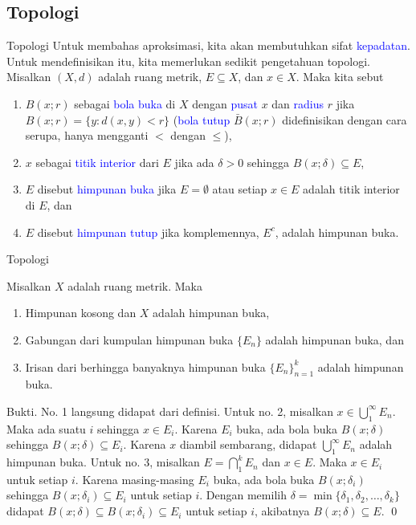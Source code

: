 \documentclass[xcolor={dvipsnames}, 9pt]{beamer}
\renewcommand{\emph}[1]{\textcolor{Blue}{#1}}
\begin{document}
    \subsection{Topologi}
    \begin{frame}{Topologi}
    	Untuk membahas aproksimasi, kita akan membutuhkan sifat \emph{kepadatan}. Untuk mendefinisikan itu, kita memerlukan sedikit pengetahuan topologi. \newline
    	Misalkan $(X,d)$ adalah ruang metrik, $E\subseteq X$, dan $x\in X$. Maka kita sebut
    	\begin{enumerate}
    		\item $B(x;r)$ sebagai \emph{bola buka} di $X$ dengan \emph{pusat} $x$ dan \emph{radius} $r$ jika $B(x;r) = \{y : d(x,y) < r\}$ (\emph{bola tutup} $\bar{B}(x;r)$ didefinisikan dengan cara serupa, hanya mengganti $<$ dengan $\leq$),
    		\item $x$ sebagai \emph{titik interior} dari $E$ jika ada $\delta>0$ sehingga $B(x;\delta)\subseteq E$,
    		\item $E$ disebut \emph{himpunan buka} jika $E=\emptyset$ atau setiap $x\in E$ adalah titik interior di $E$, dan
    		\item $E$ disebut \emph{himpunan tutup} jika komplemennya, $E^c$, adalah himpunan buka.
    	\end{enumerate}
    \end{frame}
    \begin{frame}{Topologi}
    	\begin{theorem}
    		Misalkan $X$ adalah ruang metrik. Maka
    		\begin{enumerate}
    			\item Himpunan kosong dan $X$ adalah himpunan buka,
    			\item Gabungan dari kumpulan himpunan buka $\{E_n\}$ adalah himpunan buka, dan
    			\item Irisan dari berhingga banyaknya himpunan buka $\{E_n\}_{n=1}^k$ adalah himpunan buka.
    		\end{enumerate}
    	\end{theorem}
    	Bukti. No. 1 langsung didapat dari definisi. \newline
    	Untuk no. 2, misalkan $x\in\bigcup_1^\infty E_n$. Maka ada suatu $i$ sehingga $x\in E_i$. Karena $E_i$ buka, ada bola buka $B(x;\delta)$ sehingga $B(x;\delta)\subseteq E_i$. Karena $x$ diambil sembarang, didapat $\bigcup_1^\infty E_n$ adalah himpunan buka. \newline
    	Untuk no. 3, misalkan $E = \bigcap_1^k E_n$ dan $x\in E$. Maka $x\in E_i$ untuk setiap $i$. Karena masing-masing $E_i$ buka, ada bola buka $B(x;\delta_i)$ sehingga $B(x;\delta_i)\subseteq E_i$ untuk setiap $i$. Dengan memilih $\delta=\min\{\delta_1,\delta_2,\dots,\delta_k\}$ didapat $B(x;\delta)\subseteq B(x;\delta_i)\subseteq E_i$ untuk setiap $i$, akibatnya $B(x;\delta)\subseteq E$. \qed
    \end{frame}
\end{document}
